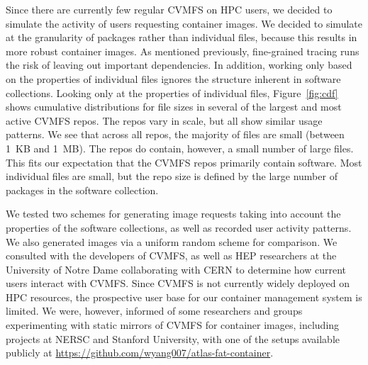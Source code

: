 \documentclass[sigconf]{acmart}
\begin{document}
Since there are currently few regular CVMFS on HPC users,
we decided to simulate the activity of users requesting container images.
We decided to simulate at the granularity of packages rather than individual files,
because this results in more robust container images.
As mentioned previously,
fine-grained tracing runs the risk of leaving out important dependencies.
In addition, working only based on the properties of individual files ignores the structure inherent in software collections.
Looking only at the properties of individual files,
Figure~\ref{fig:cdf} shows cumulative distributions for file sizes in several of the largest and most active CVMFS repos.
The repos vary in scale,
but all show similar usage patterns.
We see that across all repos,
the majority of files are small (between 1~KB and 1~MB).
The repos do contain, however,
a small number of large files.
This fits our expectation that the CVMFS repos primarily contain software.
Most individual files are small,
but the repo size is defined by the large number of packages in the software collection.

We tested two schemes for generating image requests taking into account the properties of the software collections,
as well as recorded user activity patterns.
We also generated images via a uniform random scheme for comparison.
We consulted with the developers of CVMFS,
as well as HEP researchers at the University of Notre Dame collaborating with CERN to determine how current users interact with CVMFS.
Since CVMFS is not currently widely deployed on HPC resources,
the prospective user base for our container management system is limited.
We were, however, informed of some researchers and groups experimenting with static mirrors of CVMFS for container images,
including projects at NERSC and Stanford University,
with one of the setups available publicly at \url{https://github.com/wyang007/atlas-fat-container}.
\end{document}
